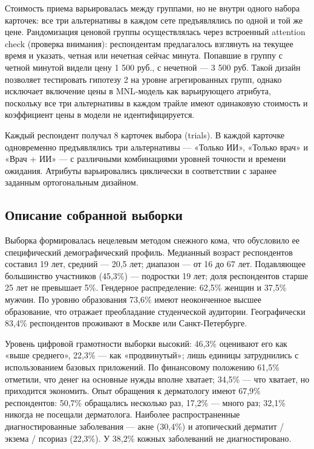 \documentclass[12pt, a4paper]{article}
\begin{document}
Стоимость приема варьировалась между группами, но не внутри одного набора карточек: все три альтернативы в каждом сете предъявлялись по одной и той же цене. Рандомизация ценовой группы осуществлялась через встроенный attention check (проверка внимания): респондентам предлагалось взглянуть на текущее время и указать, четная или нечетная сейчас минута. Попавшие в группу с четной минутой видели цену 1 500 руб., с нечетной --- 3 500 руб. Такой дизайн позволяет тестировать гипотезу 2 на уровне агрегированных групп, однако исключает включение цены в MNL-модель как варьирующего атрибута, поскольку все три альтернативы в каждом трайле имеют одинаковую стоимость и коэффициент цены в модели не идентифицируется.

Каждый респондент получал 8 карточек выбора (trials). В каждой карточке одновременно предъявлялись три альтернативы --- «Только ИИ», «Только врач» и «Врач + ИИ» --- с различными комбинациями уровней точности и времени ожидания. Атрибуты варьировались циклически в соответствии с заранее заданным ортогональным дизайном.

\subsection{Описание собранной выборки}
Выборка формировалась нецелевым методом снежного кома, что обусловило ее специфический демографический профиль. Медианный возраст респондентов составил 19 лет, средний --- 20,5 лет; диапазон --- от 16 до 67 лет. Подавляющее большинство участников (45,3\%) --- подростки 19 лет; доля респондентов старше 25 лет не превышает 5\%. Гендерное распределение: 62,5\% женщин и 37,5\% мужчин. По уровню образования 73,6\% имеют неоконченное высшее образование, что отражает преобладание студенческой аудитории. Географически 83,4\% респондентов проживают в Москве или Санкт-Петербурге.

Уровень цифровой грамотности выборки высокий: 46,3\% оценивают его как «выше среднего», 22,3\% --- как «продвинутый»; лишь единицы затруднились с использованием базовых приложений. По финансовому положению 61,5\% отметили, что денег на основные нужды вполне хватает; 34,5\% --- что хватает, но приходится экономить. Опыт обращения к дерматологу имеют 67,9\% респондентов: 50,7\% обращались несколько раз, 17,2\% --- много раз; 32,1\% никогда не посещали дерматолога. Наиболее распространенные диагностированные заболевания --- акне (30,4\%) и атопический дерматит / экзема / псориаз (22,3\%). У 38,2\% кожных заболеваний не диагностировано.
\end{document}
